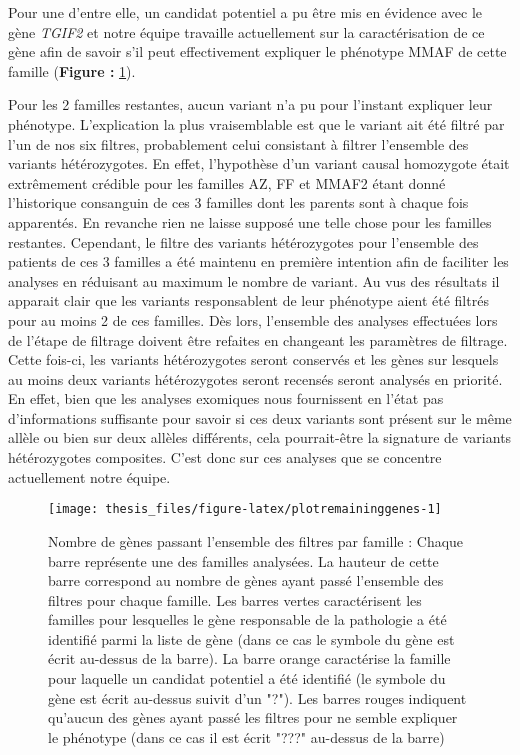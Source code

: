 \documentclass[12pt,twoside]{reedthesis}
\theoremstyle{definition}
\theoremstyle{definition}
\theoremstyle{remark}
\begin{document}
  Pour une d'entre elle, un candidat potentiel a pu être mis en évidence
  avec le gène \emph{TGIF2} et notre équipe travaille actuellement sur la
  caractérisation de ce gène afin de savoir s'il peut effectivement
  expliquer le phénotype MMAF de cette famille (\textbf{Figure :
  }\ref{fig:plotremaininggenes}).
  
  Pour les 2 familles restantes, aucun variant n'a pu pour l'instant
  expliquer leur phénotype. L'explication la plus vraisemblable est que le
  variant ait été filtré par l'un de nos six filtres, probablement celui
  consistant à filtrer l'ensemble des variants hétérozygotes. En effet,
  l'hypothèse d'un variant causal homozygote était extrêmement crédible
  pour les familles AZ, FF et MMAF2 étant donné l'historique consanguin de
  ces 3 familles dont les parents sont à chaque fois apparentés. En
  revanche rien ne laisse supposé une telle chose pour les familles
  restantes. Cependant, le filtre des variants hétérozygotes pour
  l'ensemble des patients de ces 3 familles a été maintenu en première
  intention afin de faciliter les analyses en réduisant au maximum le
  nombre de variant. Au vus des résultats il apparait clair que les
  variants responsablent de leur phénotype aient été filtrés pour au moins
  2 de ces familles. Dès lors, l'ensemble des analyses effectuées lors de
  l'étape de filtrage doivent être refaites en changeant les paramètres de
  filtrage. Cette fois-ci, les variants hétérozygotes seront conservés et
  les gènes sur lesquels au moins deux variants hétérozygotes seront
  recensés seront analysés en priorité. En effet, bien que les analyses
  exomiques nous fournissent en l'état pas d'informations suffisante pour
  savoir si ces deux variants sont présent sur le même allèle ou bien sur
  deux allèles différents, cela pourrait-être la signature de variants
  hétérozygotes composites. C'est donc sur ces analyses que se concentre
  actuellement notre équipe.
  
  \begin{figure}
  
  {\centering \texttt{[image: thesis\_files/figure-latex/plotremaininggenes-1]} 
  
  }
  
  \caption[Nombre de gènes passant l'ensemble des filtres par famille]{Nombre de gènes passant l'ensemble des filtres par famille  :  Chaque barre représente une des familles analysées. La hauteur de cette barre correspond au nombre de gènes ayant passé l'ensemble des filtres pour chaque famille. Les barres vertes caractérisent les familles pour lesquelles le gène responsable de la pathologie a été identifié parmi la liste de gène (dans ce cas le symbole du gène est écrit au-dessus de la barre). La barre orange caractérise la famille pour laquelle un candidat potentiel a été identifié (le symbole du gène est écrit au-dessus suivit d'un "?"). Les barres rouges indiquent qu'aucun des gènes ayant passé les filtres pour ne semble expliquer le phénotype (dans ce cas il est écrit "???" au-dessus de la barre)}\label{fig:plotremaininggenes}
  \end{figure}
  
\end{document}
